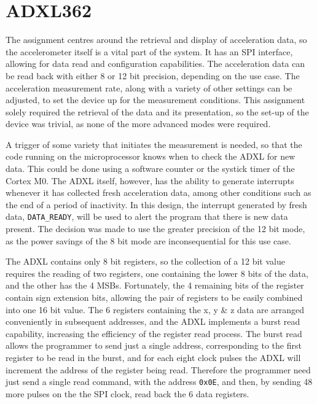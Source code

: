 \documentclass[11pt,british]{report}
\begin{document}
\section*{ADXL362}
The assignment centres around the retrieval and display of acceleration data, so the accelerometer itself is a vital part of the system. It has an SPI interface, allowing for data read and configuration capabilities. The acceleration data can be read back with either 8 or 12 bit precision, depending on the use case. The acceleration measurement rate, along with a variety of other settings can be adjusted, to set the device up for the measurement conditions. This assignment solely required the retrieval of the data and its presentation, so the set-up of the device was trivial, as none of the more advanced modes were required.

A trigger of some variety that initiates the measurement is needed, so that the code running on the microprocessor knows when to check the ADXL for new data. This could be done using a software counter or the systick timer of the Cortex M0. The ADXL itself, however, has the ability to generate interrupts whenever it has collected fresh acceleration data, among other conditions such as the end of a period of inactivity. In this design, the interrupt generated by fresh data, \texttt{DATA\_READY}, will be used to alert the program that there is new data present. The decision was made to use the greater precision of the 12 bit mode, as the power savings of the 8 bit mode are inconsequential for this use case.

The ADXL contains only 8 bit registers, so the collection of a 12 bit value requires the reading of two registers, one containing the lower 8 bits of the data, and the other has the 4 MSBs. Fortunately, the 4 remaining bits of the register contain sign extension bits, allowing the pair of registers to be easily combined into one 16 bit value. The 6 registers containing the x, y \& z data are arranged conveniently in subsequent addresses, and the ADXL implements a burst read capability, increasing the efficiency of the register read process. The burst read allows the programmer to send just a single address, corresponding to the first register to be read in the burst, and for each eight clock pulses the ADXL will increment the address of the register being read. Therefore the programmer need just send a single read command, with the address \texttt{0x0E}, and then, by sending 48 more pulses on the the SPI clock, read back the 6 data registers.
\end{document}
